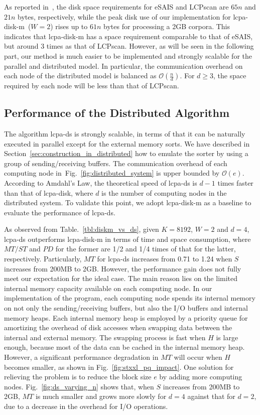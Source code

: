 \documentclass{llncs}
\begin{document}
As reported in~\cite{Juha2014}, the disk space requirements for eSAIS and LCPscan are $65n$ and $21n$ bytes, respectively, while the peak disk use of our implementation for lcpa-disk-m~($W=2$) rises up to $61n$ bytes for processing a 2GB corpora. This indicates that {lcpa-disk-m} has a space requirement comparable to that of eSAIS, but around 3 times as that of  LCPscan. However, as will be seen in the following part, our method is much easier to be implemented and strongly scalable for the parallel and distributed model. In particular, the communication overhead on each node of the distributed model is balanced as $\mathcal{O}(\frac{n}{d})$. For $d\ge 3$, the space required by each node will be less than that of LCPscan.

\subsection{Performance of the Distributed Algorithm}

The algorithm lcpa-ds is strongly scalable, in terms of that it can be naturally executed in parallel except for the external memory sorts. We have described in Section~\ref{sec:construction_in_distributed} how to emulate the sorter by using a group of sending/receiving buffers. The communication overhead of each computing node in~Fig.~\ref{fig:distributed_system} is upper bounded by $\mathcal{O}(e)$. According to Amdahl's Law, the theoretical speed of lcpa-ds is $d-1$ times faster than that of lcpa-disk, where $d$ is the number of computing nodes in the distributed system. To validate this point, we adopt lcpa-disk-m as a baseline to evaluate the performance of lcpa-ds.

As observed from Table.~\ref{tbl:diskm_vs_ds}, given $K=8192$, $W=2$ and $d=4$, lcpa-ds outperforms lcpa-disk-m in terms of time and space consumption, where $MT/ST$ and $PD$ for the former are 1/2 and 1/4 times of that for the latter, respectively. Particularly, $MT$ for lcpa-ds increases from 0.71 to 1.24 when $S$ increases from 200MB to 2GB. However, the performance gain does not fully meet our expectation for the ideal case. The main reason lies on the limited internal memory capacity available on each computing node. In our implementation of the program, each computing node spends its internal memory on not only the sending/receiving buffers, but also the I/O buffers and internal memory heaps. Each internal memory heap is employed by a priority queue for amortizing the overhead of disk accesses when swapping data between the internal and external memory. The swapping process is fast when $H$ is large enough, because most of the data can be cached in the internal memory heap. However, a significant performance degradation in $MT$ will occur when $H$ becomes smaller, as shown in Fig.~\ref{fig:stxxl_pq_impact}. One solution for relieving the problem is to reduce the block size $e$ by adding more computing nodes. Fig.~\ref{fig:ds_varying_n} shows that, when $S$ increases from 200MB to 2GB, $MT$ is much smaller and grows more slowly for $d = 4$ against that for $d = 2$, due to a decrease in the overhead for I/O operations.
\end{document}
